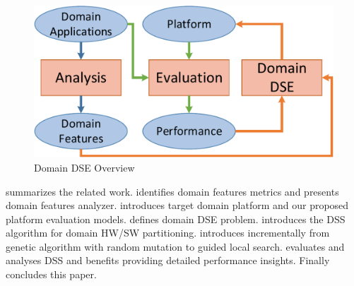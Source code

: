 
\begin{figure}[h]
	\centering
	\includegraphics[width=.65\linewidth]{fig/Overview.pdf}
	\caption{Domain DSE Overview}
	\label{fig:overview}
\end{figure}


  summarizes the related work.  identifies domain features metrics and presents domain features analyzer.  introduces target domain platform and our proposed platform evaluation models.  defines domain DSE problem.  introduces the DSS algorithm for domain HW/SW partitioning.  introduces \ga incrementally from genetic algorithm with random mutation to guided local search.   evaluates and analyses DSS and \ga benefits providing detailed performance insights. 
Finally  concludes this paper. 